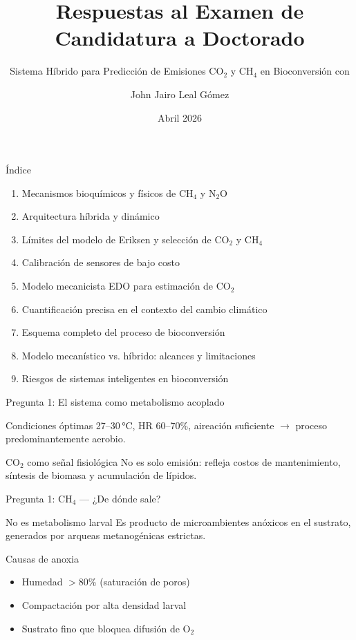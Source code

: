 \documentclass[aspectratio=169, 11pt]{beamer}
\title[Respuestas Examen]{Respuestas al Examen de Candidatura a Doctorado}
\subtitle{Sistema Híbrido para Predicción de Emisiones CO$_2$ y CH$_4$ en Bioconversión con \BSF}
\author{John Jairo Leal Gómez}
\institute[UNAL]{Doctorado en Estudios Ambientales\\Universidad Nacional de Colombia -- Sede Palmira}
\date{Abril 2026}
\newcommand{\NDIR}{\text{NDIR}}
\newcommand{\MRV}{\text{MRV}}
\begin{document}
\begin{frame}[plain]
\titlepage
\end{frame}

\begin{frame}{Índice}
\small
\begin{enumerate}
    \item Mecanismos bioquímicos y físicos de CH$_4$ y N$_2$O
    \item Arquitectura híbrida y \MRV{} dinámico
    \item Límites del modelo de Eriksen y selección de CO$_2$ y CH$_4$
    \item Calibración de sensores \NDIR{} de bajo costo
    \item Modelo mecanicista EDO para estimación de CO$_2$
    \item Cuantificación precisa en el contexto del cambio climático
    \item Esquema completo del proceso de bioconversión
    \item Modelo mecanístico vs. híbrido: alcances y limitaciones
    \item Riesgos de sistemas inteligentes en bioconversión
\end{enumerate}
\end{frame}

\begin{frame}{Pregunta 1: El sistema como metabolismo acoplado}
\begin{block}{Condiciones óptimas}
\footnotesize
27--30\,°C, HR 60--70\%, aireación suficiente $\rightarrow$ proceso predominantemente aerobio.
\end{block}
\begin{exampleblock}{CO$_2$ como señal fisiológica}
\footnotesize
No es solo emisión: refleja costos de mantenimiento, síntesis de biomasa y acumulación de lípidos.
\end{exampleblock}
\end{frame}

\begin{frame}{Pregunta 1: CH$_4$ --- ¿De dónde sale?}
\begin{alertblock}{No es metabolismo larval}
\footnotesize
Es producto de microambientes anóxicos en el sustrato, generados por arqueas metanogénicas estrictas.
\end{alertblock}
\begin{block}{Causas de anoxia}
\footnotesize
\begin{itemize}
    \item Humedad $>80$\% (saturación de poros)
    \item Compactación por alta densidad larval
    \item Sustrato fino que bloquea difusión de O$_2$
\end{itemize}
\end{block}
\end{frame}
\end{document}
